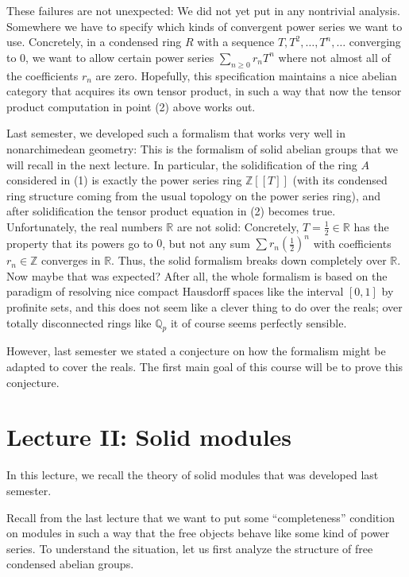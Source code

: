 \documentclass[11pt]{amsbook}
\numberwithin{equation}{section}
\numberwithin{theorem}{section}
\theoremstyle{definition}
\begin{document}
These failures are not unexpected: We did not yet put in any nontrivial analysis. Somewhere we have to specify which kinds of convergent power series we want to use. Concretely, in a condensed ring $R$ with a sequence $T,T^2,\ldots,T^n,\ldots$ converging to $0$, we want to allow certain power series $\sum_{n\geq 0} r_n T^n$ where not almost all of the coefficients $r_n$ are zero. Hopefully, this specification maintains a nice abelian category that acquires its own tensor product, in such a way that now the tensor product computation in point (2) above works out.

Last semester, we developed such a formalism that works very well in nonarchimedean geometry: This is the formalism of solid abelian groups that we will recall in the next lecture. In particular, the solidification of the ring $A$ considered in (1) is exactly the power series ring $\mathbb Z[[T]]$ (with its condensed ring structure coming from the usual topology on the power series ring), and after solidification the tensor product equation in (2) becomes true. Unfortunately, the real numbers $\mathbb R$ are not solid: Concretely, $T=\frac 12\in \mathbb R$ has the property that its powers go to $0$, but not any sum $\sum r_n (\frac 12)^n$ with coefficients $r_n\in \mathbb Z$ converges in $\mathbb R$. Thus, the solid formalism breaks down completely over $\mathbb R$. Now maybe that was expected? After all, the whole formalism is based on the paradigm of resolving nice compact Hausdorff spaces like the interval $[0,1]$ by profinite sets, and this does not seem like a clever thing to do over the reals; over totally disconnected rings like $\mathbb Q_p$ it of course seems perfectly sensible.

However, last semester we stated a conjecture on how the formalism might be adapted to cover the reals. The first main goal of this course will be to prove this conjecture.

\newpage

\section{Lecture II: Solid modules}

In this lecture, we recall the theory of solid modules that was developed last semester.

Recall from the last lecture that we want to put some ``completeness'' condition on modules in such a way that the free objects behave like some kind of power series. To understand the situation, let us first analyze the structure of free condensed abelian groups.
\end{document}
